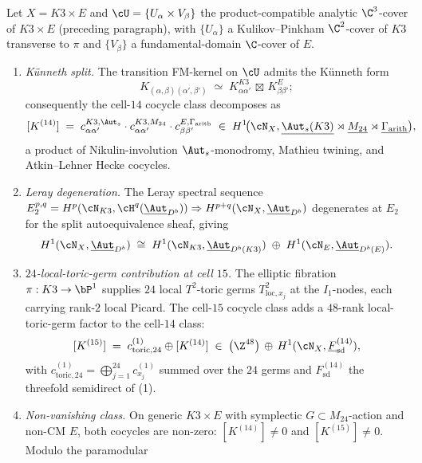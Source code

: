 \begin{theorem}
\label{gluing:thm:cell-14-15-explicit-cocycle}
Let $X = K3\times E$ and $\cU = \{U_{\alpha}\times V_{\beta}\}$
the product-compatible analytic $\C^{3}$-cover of $K3\times E$
(preceding paragraph), with $\{U_{\alpha}\}$ a Kulikov--Pinkham
$\C^{2}$-cover of $K3$ transverse to $\pi$ and $\{V_{\beta}\}$ a
fundamental-domain $\C$-cover of $E$.
\begin{enumerate}[leftmargin=2em]
 \item \emph{K\"{u}nneth split.} The transition FM-kernel on
 $\cU$ admits the K\"{u}nneth form
 \[
 K_{(\alpha,\beta)(\alpha',\beta')}\;\simeq\;
 K^{K3}_{\alpha\alpha'}\,\boxtimes\,K^{E}_{\beta\beta'};
 \]
 consequently the cell-$14$ cocycle class decomposes as
 \[
 [K^{(14)}]
 \;=\;
 c^{K3,\Aut_{s}}_{\alpha\alpha'}
 \cdot
 c^{K3,M_{24}}_{\alpha\alpha'}
 \cdot
 c^{E,\Gamma_{\mathrm{arith}}}_{\beta\beta'}
 \;\in\;
 H^{1}\!\bigl(\cN_{X},\underline{\Aut_{s}(K3)}\rtimes\underline{M_{24}}
 \rtimes\underline{\Gamma_{\mathrm{arith}}}\bigr),
 \]
 a product of Nikulin-involution $\Aut_{s}$-monodromy, Mathieu twining,
 and Atkin--Lehner Hecke cocycles.
 \item \emph{Leray degeneration.} The Leray spectral sequence
 $E_{2}^{p,q}=H^{p}(\cN_{K3},\cH^{q}(\underline{\Aut}_{D^{b}}))
 \Rightarrow H^{p+q}(\cN_{X},\underline{\Aut}_{D^{b}})$
 degenerates at $E_{2}$ for the split autoequivalence sheaf, giving
 \[
 H^{1}(\cN_{X},\underline{\Aut}_{D^{b}})\;\cong\;
 H^{1}(\cN_{K3},\underline{\Aut}_{D^{b}(K3)})\;\oplus\;
 H^{1}(\cN_{E},\underline{\Aut}_{D^{b}(E)}).
 \]
 \item \emph{$24$-local-toric-germ contribution at cell $15$.}
 The elliptic fibration $\pi:K3\to\bP^{1}$ supplies $24$ local
 $T^{2}$-toric germs $T^{2}_{\mathrm{loc},x_{j}}$ at the $I_{1}$-nodes,
 each carrying rank-$2$ local Picard. The cell-$15$ cocycle class adds
 a $48$-rank local-toric-germ factor to the cell-$14$ class:
 \[
 [K^{(15)}]\;=\;c^{(1)}_{\mathrm{toric},24}\oplus[K^{(14)}]
 \;\in\;
 \bigl(\Z^{48}\bigr)\,\oplus\,H^{1}(\cN_{X},
 \underline{F}^{(14)}_{\mathrm{sd}}),
 \]
 with $c^{(1)}_{\mathrm{toric},24}=\bigoplus_{j=1}^{24}
 c^{(1)}_{x_{j}}$ summed over the $24$ germs and $F^{(14)}_{\mathrm{sd}}$
 the threefold semidirect of (1).
 \item \emph{Non-vanishing class.} On generic $K3\times E$ with symplectic
 $G\subset M_{24}$-action and non-CM $E$, both cocycles are non-zero:
 $[K^{(14)}]\neq 0$ and $[K^{(15)}]\neq 0$. Modulo the paramodular

\end{enumerate}
\end{theorem}
